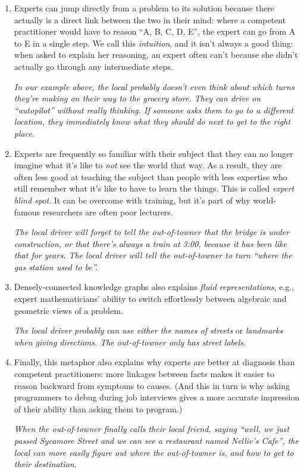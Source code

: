 \begin{enumerate}
\item
  Experts can jump directly from a problem to its solution because there
  actually is a direct link between the two in their mind: where a
  competent practitioner would have to reason ``A, B, C, D, E'', the
  expert can go from A to E in a single step. We call this
  \emph{intuition}, and it isn't always a good thing: when asked to
  explain her reasoning, an expert often can't because she didn't
  actually go through any intermediate steps.

  \emph{In our example above, the local probably doesn't even think
  about which turns they're making on their way to the grocery store.
  They can drive on ``autopilot'' without really thinking. If someone
  asks them to go to a different location, they immediately know what
  they should do next to get to the right place.}
\item
  Experts are frequently so familiar with their subject that they can no
  longer imagine what it's like to \emph{not} see the world that way. As
  a result, they are often less good at teaching the subject than people
  with less expertise who still remember what it's like to have to learn
  the things. This is called \emph{expert blind spot}. It can be
  overcome with training, but it's part of why world-famous researchers
  are often poor lecturers.

  \emph{The local driver will forget to tell the out-of-towner that the
  bridge is under construction, or that there's always a train at 3:00,
  because it has been like that for years. The local driver will tell
  the out-of-towner to turn ``where the gas station used to be''.}
\item
  Densely-connected knowledge graphs also explains \emph{fluid
  representations}, e.g., expert mathematicians' ability to switch
  effortlessly between algebraic and geometric views of a problem.

  \emph{The local driver probably can use either the names of streets}
  or \emph{landmarks when giving directions. The out-of-towner only has
  street labels.}
\item
  Finally, this metaphor also explains why experts are better at
  diagnosis than competent practitioners: more linkages between facts
  makes it easier to reason backward from symptoms to causes. (And this
  in turn is why asking programmers to debug during job interviews gives
  a more accurate impression of their ability than asking them to
  program.)

  \emph{When the out-of-towner finally calls their local friend, saying
  ``well, we just passed Sycamore Street and we can see a restaurant
  named Nellie's Cafe'', the local can more easily figure out where the
  out-of-towner is, and how to get to their destination.}
\end{enumerate}

